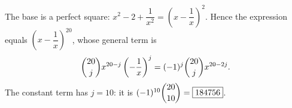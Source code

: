 The base is a perfect square: $x^2-2+\dfrac{1}{x^2}=\left(x-\dfrac{1}{x}\right)^2$. Hence the expression equals $\left(x-\dfrac{1}{x}\right)^{20}$, whose general term is
\[
\dbinom{20}{j}x^{20-j}\left(-\dfrac{1}{x}\right)^{j}=(-1)^j\dbinom{20}{j}x^{20-2j}.
\]
The constant term has $j=10$: it is $(-1)^{10}\dbinom{20}{10}=\boxed{184756}$.
